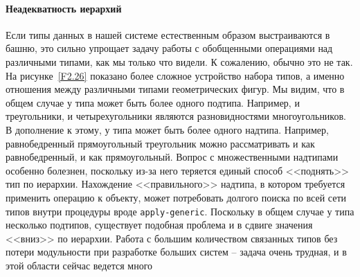 \paragraph{Неадекватность иерархий}


Если типы данных в нашей системе естественным образом
выстраиваются в башню, это сильно упрощает задачу работы с обобщенными
операциями над различными типами, как мы только что видели.  К
сожалению, обычно это не так.  На рисунке~\ref{F2.26}
показано более сложное устройство набора типов, а именно отношения
между различными типами геометрических фигур.
Мы видим, что в общем случае у типа может быть более одного подтипа.  Например, и
треугольники, и четырехугольники являются разновидностями
многоугольников. В дополнение к этому, у типа может быть  
более одного
надтипа.  Например, равнобедренный прямоугольный треугольник можно
рассматривать и как равнобедренный, и как прямоугольный.  Вопрос с
множественными надтипами особенно болезнен, поскольку из-за него
теряется единый способ <<поднять>> тип по иерархии.  Нахождение
<<правильного>> надтипа, в котором требуется применить операцию к
объекту, может потребовать долгого поиска по всей сети типов внутри
процедуры вроде {\tt apply-generic}.  Поскольку в общем случае
у типа несколько подтипов, существует подобная проблема и в сдвиге
значения <<вниз>> по иерархии. Работа с большим количеством связанных
типов без потери модульности при разработке больших систем --
задача очень трудная, и в этой области сейчас ведется много
